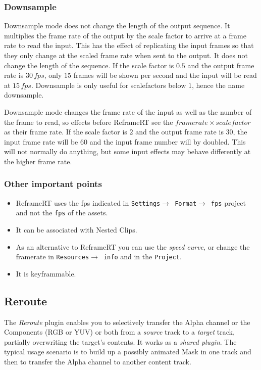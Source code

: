 \subsubsection*{Downsample}%
\label{ssub:downsample}

Downsample mode does not change the length of the output sequence. It multiplies the frame rate of the output by the scale factor to arrive at a frame rate to read the input. This has the effect of replicating the input frames so that they only change at the scaled frame rate when sent to the output. It does not change the length of the sequence. If the scale factor is $0.5$ and the output frame rate is $30 \,fps$, only $15$ frames will be shown per second and the input will be read at $15 \,fps$. Downsample is only useful for scalefactors below $1$, hence the name downsample.

Downsample mode changes the frame rate of the input as well as the number of the frame to read, so effects before ReframeRT see the $frame rate \times scale factor$ as their frame rate. If the scale factor is $2$ and the output frame rate is $30$, the input frame rate will be $60$ and the input frame number will by doubled. This will not normally do anything, but some input effects may behave differently at the higher frame rate.

\subsubsection*{Other important points}%
\label{ssub:other_important_points}

\begin{itemize}
    \item ReframeRT uses the fps indicated in \texttt{Settings$\rightarrow$ Format$\rightarrow$ fps} project and not the \texttt{fps} of the assets.
    \item It can be associated with Nested Clips.
    \item As an alternative to ReframeRT you can use the \textit{speed curve}, or change the framerate in \texttt{Resources$\rightarrow$ info} and in the \texttt{Project}.
    \item It is keyframmable.
\end{itemize}

\subsection{Reroute}%
\label{sub:reroute}

The \textit{Reroute} plugin enables you to selectively transfer the Alpha channel or the Components (RGB or YUV) or both from a \textit{source} track to a \textit{target} track, partially overwriting the target's contents. It works as a \textit{shared plugin}. The typical usage scenario is to build up a possibly animated Mask in one track and then to transfer the Alpha channel to another content track.

